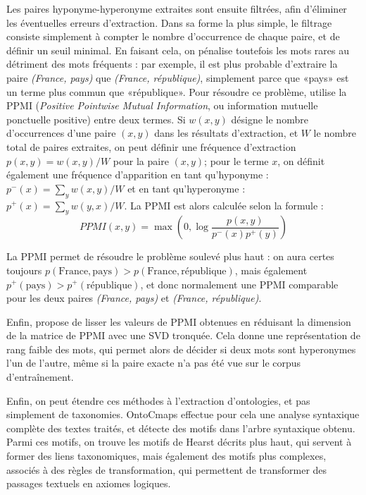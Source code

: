 Les paires hyponyme-hyperonyme extraites sont ensuite filtrées, afin d'éliminer les éventuelles erreurs d'extraction. Dans sa forme la plus simple, le filtrage consiste simplement à compter le nombre d'occurrence de chaque paire, et de définir un seuil minimal. En faisant cela, on pénalise toutefois les mots rares au détriment des mots fréquents : par exemple, il est plus probable d'extraire la paire \textit{(France, pays)} que \textit{(France, république)}, simplement parce que «pays» est un terme plus commun que «république». Pour résoudre ce problème, \cite{turney2001mining} utilise la PPMI (\textit{Positive Pointwise Mutual Information}, ou information mutuelle ponctuelle positive) entre deux termes. Si $w(x, y)$ désigne le nombre d'occurrences d'une paire $(x, y)$ dans les résultats d'extraction, et $W$ le nombre total de paires extraites, on peut définir une fréquence d'extraction $p(x, y) = w(x,y) / W$ pour la paire $(x, y)$; pour le terme $x$, on définit également une fréquence d'apparition en tant qu'hyponyme : $p^-(x) = \sum_y w(x, y) / W$ et en tant qu'hyperonyme : $p^+(x) = \sum_y w(y, x) / W$. La PPMI est alors calculée selon la formule :
\begin{equation}
    PPMI(x, y) = \max \left(0, \log\frac{p(x, y)}{p^-(x)p^+(y)} \right)
\end{equation}

La PPMI permet de résoudre le problème soulevé plus haut : on aura certes toujours $p(\textrm{France}, \allowbreak \textrm{pays}) > p(\textrm{France}, \textrm{république})$, mais également $p^+(\textrm{pays}) > p^+(\textrm{république})$, et donc normalement une PPMI comparable pour les deux paires \textit{(France, pays)} et \textit{(France, république)}.

Enfin, \cite{roller-etal-2018-hearst} propose de lisser les valeurs de PPMI obtenues en réduisant la dimension de la matrice de PPMI avec une SVD tronquée. Cela donne une représentation de rang faible des mots, qui permet alors de décider si deux mots sont hyperonymes l'un de l'autre, même si la paire exacte n'a pas été vue sur le corpus d'entraînement.


Enfin, on peut étendre ces méthodes à l'extraction d'ontologies, et pas simplement de taxonomies. OntoCmaps \cite{zouaq2011towards} effectue pour cela une analyse syntaxique complète des textes traités, et détecte des motifs dans l'arbre syntaxique obtenu. Parmi ces motifs, on trouve les motifs de Hearst décrits plus haut, qui servent à former des liens taxonomiques, mais également des motifs plus complexes, associés à des règles de transformation, qui permettent de transformer des passages textuels en axiomes logiques. 


